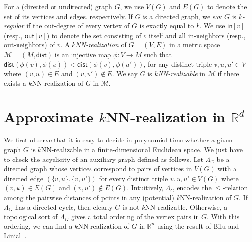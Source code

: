 \documentclass[11pt]{article}
\begin{document}
For a (directed or undirected) graph $G$, we use $V(G)$ and $E(G)$ to denote the set of its vertices and edges, respectively. If $G$ is a directed graph, we say $G$ is \textit{$k$-regular} if the out-degree of every vertex of $G$ is exactly equal to $k$. We use $\mathsf{in}[v]$ (resp., $\mathsf{out}[v]$) to denote the set consisting of $v$ itself and all in-neighbors (resp., out-neighbors) of $v$.
A \textit{$k$NN-realization} of $G = (V,E)$ in a metric space $\mathcal{M} = (M,\mathsf{dist})$ is an injective map $\phi: V \rightarrow M$ such that  $\mathsf{dist}(\phi(v),\phi(u)) < \mathsf{dist}(\phi(v),\phi(u'))$, for any distinct triple $v,u,u' \in V$ where $(v,u) \in E$ and $(v,u') \notin E$.
We say $G$ is \textit{$k$NN-realizable} in $\mathcal{M}$ if there exists a $k$NN-realization of $G$ in $\mathcal{M}$.

\section{Approximate \texorpdfstring{$k$}{k}NN-realization in \texorpdfstring{$\mathbb{R}^d$}{Rd}}

We first observe that it is easy to decide in polynomial time whether a given graph $G$ is $k$NN-realizable in a finite-dimensional Euclidean space.
We just have to check the acyclicity of an auxiliary graph defined as follows. Let $\varLambda_G$ be a directed graph whose vertices correspond to pairs of vertices in $V(G)$ with a directed edge $(\{v,u\},\{v,u'\})$ for every distinct triple $v,u,u' \in V(G)$ where $(v,u) \in E(G)$ and $(v,u') \notin E(G)$.
Intuitively, $\varLambda_G$ encodes the $\leq$-relation among the pairwise distances of points in any (potential) $k$NN-realization of $G$.
If $\varLambda_G$ has a directed cycle, then clearly $G$ is not $k$NN-realizable.
Otherwise, a topological sort of $\varLambda_G$ gives a total ordering of the vertex pairs in $G$.
With this ordering, we can find a $k$NN-realization of $G$ in $\mathbb{R}^n$ using the result of Bilu and Linial~\cite{bilu2005}.
\end{document}
